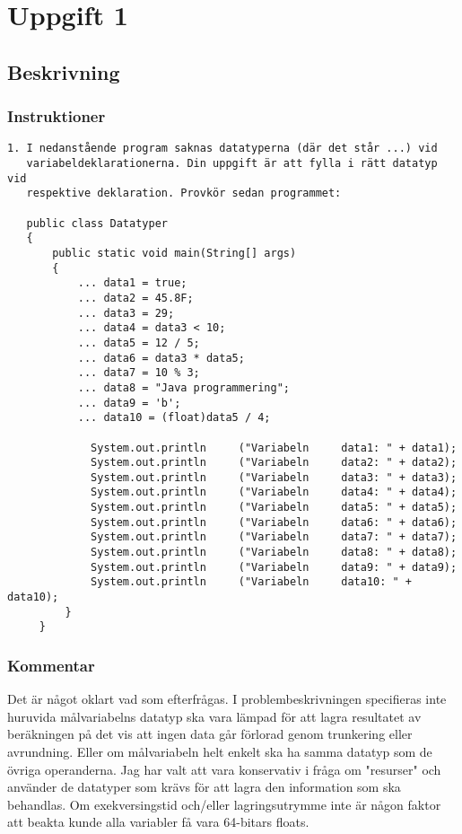 \section{Uppgift 1}\label{uppgift-1}

\subsection{Beskrivning}
\subsubsection*{Instruktioner}
\begin{verbatim}
1. I nedanstående program saknas datatyperna (där det står ...) vid
   variabeldeklarationerna. Din uppgift är att fylla i rätt datatyp vid
   respektive deklaration. Provkör sedan programmet:

   public class Datatyper
   {
       public static void main(String[] args)
       {
           ... data1 = true;
           ... data2 = 45.8F;
           ... data3 = 29;
           ... data4 = data3 < 10;
           ... data5 = 12 / 5;
           ... data6 = data3 * data5;
           ... data7 = 10 % 3;
           ... data8 = "Java programmering";
           ... data9 = 'b';
           ... data10 = (float)data5 / 4;

             System.out.println     ("Variabeln     data1: " + data1);
             System.out.println     ("Variabeln     data2: " + data2);
             System.out.println     ("Variabeln     data3: " + data3);
             System.out.println     ("Variabeln     data4: " + data4);
             System.out.println     ("Variabeln     data5: " + data5);
             System.out.println     ("Variabeln     data6: " + data6);
             System.out.println     ("Variabeln     data7: " + data7);
             System.out.println     ("Variabeln     data8: " + data8);
             System.out.println     ("Variabeln     data9: " + data9);
             System.out.println     ("Variabeln     data10: " + data10);
         }
     }
\end{verbatim}

\subsubsection*{Kommentar}
Det är något oklart vad som efterfrågas. I problembeskrivningen specifieras
inte huruvida målvariabelns datatyp ska vara lämpad för att lagra resultatet av
beräkningen på det vis att ingen data går förlorad genom trunkering eller
avrundning.  Eller om målvariabeln helt enkelt ska ha samma datatyp som de
övriga operanderna. Jag har valt att vara konservativ i fråga om "resurser" 
och använder de datatyper som krävs för att lagra den information som ska
behandlas. Om exekversingstid och/eller lagringsutrymme inte är någon faktor att
beakta kunde alla variabler få vara 64-bitars floats.

